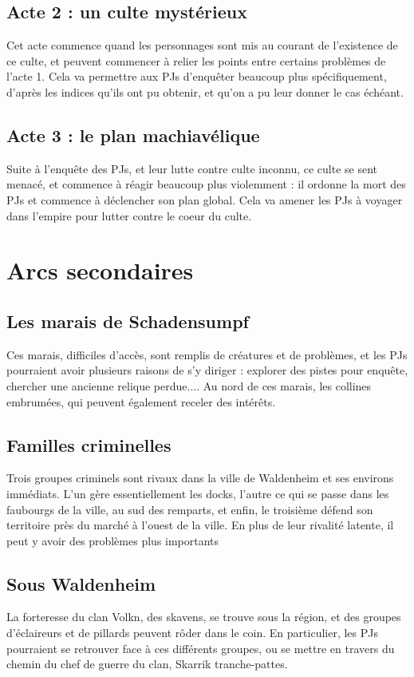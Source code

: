 \documentclass[10pt,a4paper]{book}
\newcommand{\nomadversaire}{culte inconnu}
\begin{document}
\subsection{Acte 2 : un culte mystérieux}
Cet acte commence quand les personnages sont mis au courant de l'existence de ce culte, et peuvent commencer à relier les points entre certains problèmes de l'acte 1. Cela va permettre aux PJs d'enquêter beaucoup plus spécifiquement, d'après les indices qu'ils ont pu obtenir, et qu'on a pu leur donner le cas échéant.
\subsection{Acte 3 : le plan machiavélique}
Suite à l'enquête des PJs, et leur lutte contre \nomadversaire, ce culte se sent menacé, et commence à réagir beaucoup plus violemment : il ordonne la mort des PJs et commence à déclencher son plan global. Cela va amener les PJs à voyager dans l'empire pour lutter contre le coeur du culte.
\section{Arcs secondaires}
\subsection{Les marais de Schadensumpf}
Ces marais, difficiles d'accès, sont remplis de créatures et de problèmes, et les PJs pourraient avoir plusieurs raisons de s'y diriger : explorer des pistes pour enquête, chercher une ancienne relique perdue.... Au nord de ces marais, les collines embrumées, qui peuvent également receler des intérêts.
\subsection{Familles criminelles}
Trois groupes criminels sont rivaux dans la ville de Waldenheim et ses environs immédiats. L'un gère essentiellement les docks, l'autre ce qui se passe dans les faubourgs de la ville, au sud des remparts, et enfin, le troisième défend son territoire près du marché à l'ouest de la ville. En plus de leur rivalité latente, il peut y avoir des problèmes plus importants
\subsection{Sous Waldenheim}
La forteresse du clan Volkn, des skavens, se trouve sous la région, et des groupes d'éclaireurs et de pillards peuvent rôder dans le coin. En particulier, les PJs pourraient se retrouver face à ces différents groupes, ou se mettre en travers du chemin du chef de guerre du clan, Skarrik tranche-pattes.
\end{document}
